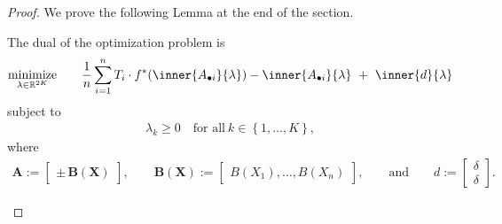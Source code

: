 \begin{proof}
  We prove the following Lemma at the end of the section.
  \begin{lemma}
    The dual of the optimization problem is
  \begin{gather*}
    \underset{\lambda \in \R^{2K}}{\mathrm{minimize}}
    \qquad
    \frac{1}{n}
    \sum_{i = 1}^{n} 
    T_i 
    \cdot
    f^*
    (
    \inner{A_{\bullet i}}{\lambda}
    )
    -
    \inner{A_{\bullet i}}{\lambda}
    \ 
    +
    \ 
    \inner{d}{\lambda}
  \end{gather*}
  subject to
  \begin{gather*}
    \lambda_k \ge 0
    \quad
    \text{for all}\ 
    k \in \left\{ 1, \ldots, K \right\}
    ,
  \end{gather*}
  where
  \begin{gather*}
    \mathbf{A}
    :=
    \begin{bmatrix}
      \pm \, \mathbf{B}(\mathbf{X})
    \end{bmatrix}
    ,
    \qquad
    \mathbf{B}(\mathbf{X})
    :=
    \begin{bmatrix}
      B(X_1), \ldots, B(X_n)
    \end{bmatrix}
    ,
    \qquad
    \text{and}
    \qquad
    d
    :=
    \begin{bmatrix}
      \delta \\
      \delta
    \end{bmatrix}
    .
  \end{gather*}


\end{lemma}
\end{proof}
